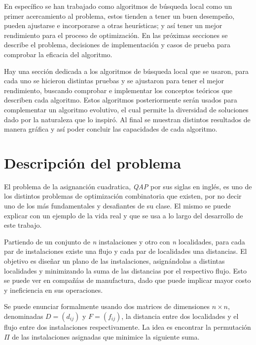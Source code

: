 En específico se han trabajado como algoritmos de búsqueda local como un primer acercamiento al problema, estos tienden a tener un buen desempeño, pueden ajustarse e incorporarse a otras heurísticas; y así tener un mejor rendimiento para el proceso de optimización. En las próximas secciones se describe el problema, decisiones de implementación y casos de prueba para comprobar la eficacia del algoritmo.

Hay una sección dedicada a los algoritmos de búsqueda local que se usaron, para cada uno se hicieron distintas pruebas y se ajustaron para tener el mejor rendimiento, buscando comprobar e implementar los conceptos teóricos que describen cada algoritmo. Estos algoritmos posteriormente serán usados para complementar un algoritmo evolutivo, el cual permite la diversidad de soluciones dado por la naturaleza que lo inspiró. Al final se muestran distintos resultados de manera gráfica y así poder concluir las capacidades de cada algoritmo.

\newpage

\section*{Descripción del problema}

El problema de la asignanción cuadratica, \textit{QAP} por sus siglas en inglés, es uno de los distintos problemas de optimización combinatoria que existen, por no decir uno de los más fundamentales y desafiantes de su clase. El mismo se puede explicar con un ejemplo de la vida real y que se usa a lo largo del desarrollo de este trabajo.

Partiendo de un conjunto de \textit{n} instalaciones y otro con \textit{n} localidades, para cada par de instalaciones existe una flujo y cada par de localidades una distancias. El objetivo es diseñar un plano de las instalaciones, asignándolas a distintas localidades y minimizando la suma de las distancias por el respectivo flujo. Esto se puede ver en compañías de manufactura, dado que puede implicar mayor costo y ineficiencia en sus operaciones\cite{evo:07:cec}.

Se puede enunciar formalmente usando dos matrices de dimensiones $n\times n$, denominadas $D = (d_{ij})$ y $F = (f_{ij})$, la distancia entre dos localidades y el flujo entre dos instalaciones respectivamente. La idea es encontrar la permutación $\Pi$ de las instalaciones asignadas que minimice la siguiente suma\cite{sm:10:advcomp}.

